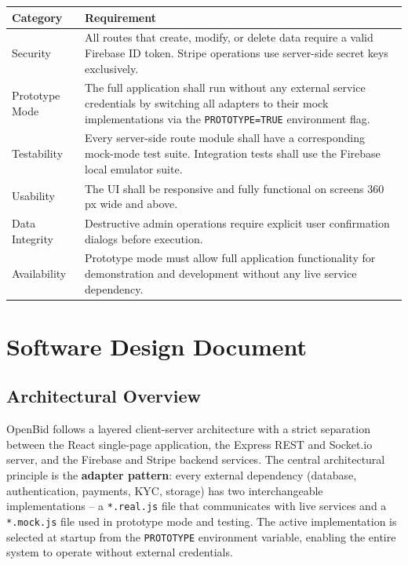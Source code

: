 \documentclass[11pt]{article}
\begin{document}
\begin{longtable}{@{}p{3cm}p{10.5cm}@{}}
\toprule
\textbf{Category} & \textbf{Requirement} \\
\midrule
\endhead
Security & All routes that create, modify, or delete data require a valid Firebase ID token. Stripe operations use server-side secret keys exclusively. \\
\midrule
Prototype Mode & The full application shall run without any external service credentials by switching all adapters to their mock implementations via the \texttt{PROTOTYPE=TRUE} environment flag. \\
\midrule
Testability & Every server-side route module shall have a corresponding mock-mode test suite. Integration tests shall use the Firebase local emulator suite. \\
\midrule
Usability & The UI shall be responsive and fully functional on screens 360\,px wide and above. \\
\midrule
Data Integrity & Destructive admin operations require explicit user confirmation dialogs before execution. \\
\midrule
Availability & Prototype mode must allow full application functionality for demonstration and development without any live service dependency. \\
\bottomrule
\end{longtable}

\newpage

\section{Software Design Document}

\subsection{Architectural Overview}

OpenBid follows a layered client-server architecture with a strict separation between
the React single-page application, the Express REST and Socket.io server, and the
Firebase and Stripe backend services. The central architectural principle is the
\textbf{adapter pattern}: every external dependency (database, authentication, payments,
KYC, storage) has two interchangeable implementations -- a \texttt{*.real.js} file that
communicates with live services and a \texttt{*.mock.js} file used in prototype mode and
testing. The active implementation is selected at startup from the \texttt{PROTOTYPE}
environment variable, enabling the entire system to operate without external credentials.
\end{document}
